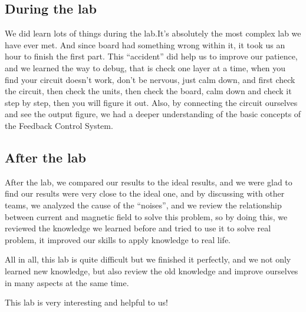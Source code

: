 \documentclass[12pt]{article}
\begin{document}
\subsection{During the lab}
We did learn lots of things during the lab.It’s absolutely the most complex lab we have ever met. And since board had something wrong within it, it took us an hour to finish the first part. This “accident” did help us to improve our patience, and we learned the way to debug, that is check one layer at a time, when you find your circuit doesn’t work, don’t be nervous, just calm down, and first check the circuit, then check the units, then check the board, calm down and check it step by step, then you will figure it out. Also, by connecting the circuit ourselves and see the output figure, we had a deeper understanding of the basic concepts of the Feedback Control System.
\subsection{After the lab}
After the lab, we compared our results to the ideal results, and we were glad to find our results were very close to the ideal one, and by discussing with other teams, we analyzed the cause of the “noises”, and we review the relationship between current and magnetic field to solve this problem, so by doing this, we reviewed the knowledge we learned before and tried to use it to solve real problem, it improved our skills to apply knowledge to real life.
\par All in all, this lab is quite difficult but we finished it perfectly, and we not only learned new knowledge, but also review the old knowledge and improve ourselves in many aspects at the same time.
\par This lab is very interesting and helpful to us!
\end{document}
